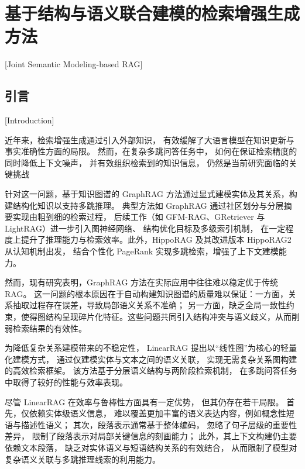 
\chapter{基于结构与语义联合建模的检索增强生成方法}[Joint Semantic Modeling-based RAG]

\section{引言}[Introduction]

近年来，检索增强生成通过引入外部知识，
有效缓解了大语言模型在知识更新与事实准确性方面的局限。
然而，在复杂多跳问答任务中，
如何在保证检索精度的同时降低上下文噪声，
并有效组织检索到的知识信息，
仍然是当前研究面临的关键挑战

针对这一问题，基于知识图谱的 GraphRAG\cite{graphrag} 方法通过显式建模实体及其关系，构建结构化知识以支持多跳推理。
典型方法如 GraphRAG 通过社区划分与分层摘要实现由粗到细的检索过程，
后续工作（如 GFM-RAG\cite{gfm-rag}、GRetriever\cite{g-retriever} 与 LightRAG\cite{lightrag}）进一步引入图神经网络、
结构优化目标及多级索引机制，
在一定程度上提升了推理能力与检索效率。此外，HippoRAG 及其改进版本 HippoRAG2 从认知机制出发，
结合个性化 PageRank 实现多跳检索，增强了上下文建模能力。

然而，现有研究表明，GraphRAG 方法在实际应用中往往难以稳定优于传统 RAG。
这一问题的根本原因在于自动构建知识图谱的质量难以保证：一方面，关系抽取过程存在误差，导致局部语义关系不准确；
另一方面，缺乏全局一致性约束，使得图结构呈现碎片化特征。这些问题共同引入结构冲突与语义歧义，从而削弱检索结果的有效性。

为降低复杂关系建模带来的不稳定性，
LinearRAG\cite{linearrag} 提出以“线性图”为核心的轻量化建模方式，
通过仅建模实体与文本之间的语义关联，
实现无需复杂关系图构建的高效检索框架。
该方法基于分层语义结构与两阶段检索机制，
在多跳问答任务中取得了较好的性能与效率表现。

尽管 LinearRAG 在效率与鲁棒性方面具有一定优势，
但其仍存在若干局限。
首先，仅依赖实体级语义信息，
难以覆盖更加丰富的语义表达内容，例如概念性短语与描述性语义；
其次，段落表示通常基于整体编码，
忽略了句子层级的重要性差异，
限制了段落表示对局部关键信息的刻画能力；
此外，其上下文构建仍主要依赖文本段落，
缺乏对实体语义与短语结构关系的有效结合，
从而限制了模型对复杂语义关联与多跳推理线索的利用能力。


